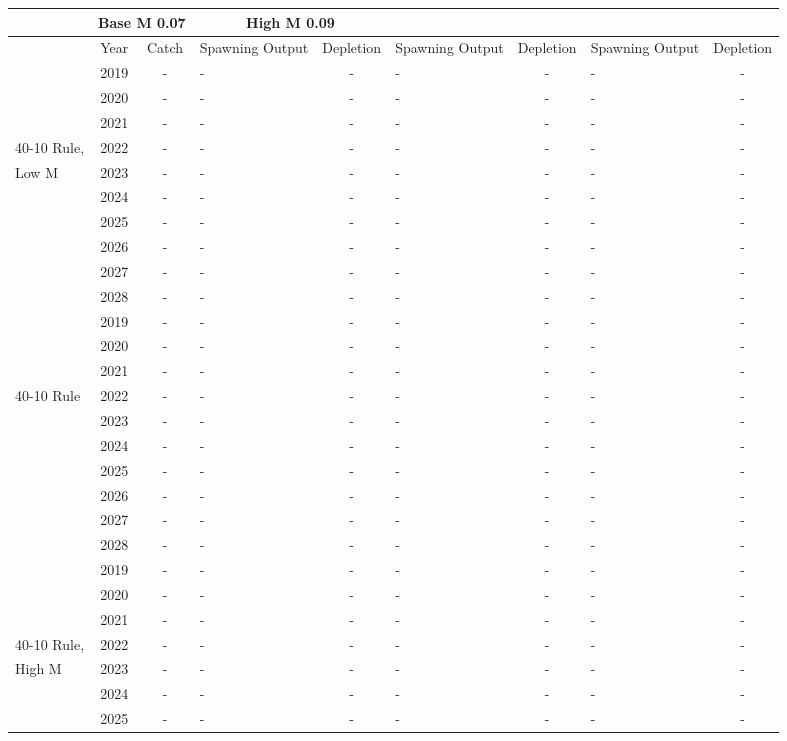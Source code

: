 \documentclass[12pt,]{article}
\begin{document}
\begin{table}[ht]
{\begin{tabular}{l|cc|>{\centering}p{.7in}c|>{\centering}p{.7in}c|>{\centering}p{.7in}c}
                          &  \multicolumn{2}{c}{Base M 0.07} 
                          &   \multicolumn{2}{c}{High M 0.09} \\
 \hline
 & Year & Catch & Spawning Output & Depletion & Spawning Output & Depletion & Spawning Output & Depletion \\ 
  \hline
 & 2019 & - & - & - & - & - & - & - \\ 
   & 2020 & - & - & - & - & - & - & - \\ 
   & 2021 & - & - & - & - & - & - & - \\ 
  40-10 Rule,  & 2022 & - & - & - & - & - & - & - \\ 
  Low M & 2023 & - & - & - & - & - & - & - \\ 
   & 2024 & - & - & - & - & - & - & - \\ 
   & 2025 & - & - & - & - & - & - & - \\ 
   & 2026 & - & - & - & - & - & - & - \\ 
   & 2027 & - & - & - & - & - & - & - \\ 
   & 2028 & - & - & - & - & - & - & - \\ 
   \hline
 & 2019 & - & - & - & - & - & - & - \\ 
   & 2020 & - & - & - & - & - & - & - \\ 
   & 2021 & - & - & - & - & - & - & - \\ 
  40-10 Rule & 2022 & - & - & - & - & - & - & - \\ 
   & 2023 & - & - & - & - & - & - & - \\ 
   & 2024 & - & - & - & - & - & - & - \\ 
   & 2025 & - & - & - & - & - & - & - \\ 
   & 2026 & - & - & - & - & - & - & - \\ 
   & 2027 & - & - & - & - & - & - & - \\ 
   & 2028 & - & - & - & - & - & - & - \\ 
   \hline
 & 2019 & - & - & - & - & - & - & - \\ 
   & 2020 & - & - & - & - & - & - & - \\ 
   & 2021 & - & - & - & - & - & - & - \\ 
  40-10 Rule, & 2022 & - & - & - & - & - & - & - \\ 
  High M & 2023 & - & - & - & - & - & - & - \\ 
   & 2024 & - & - & - & - & - & - & - \\ 
   & 2025 & - & - & - & - & - & - & - \\ 

\end{tabular}}
\end{table}
\end{document}
